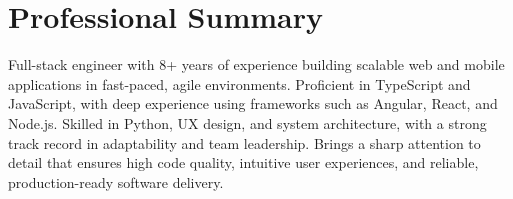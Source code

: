 \section{Professional Summary}
\noindent \normalsize Full-stack engineer with 8+ years of experience building scalable web and mobile applications in fast-paced, agile environments. Proficient in TypeScript and JavaScript, with deep experience using frameworks such as Angular, React, and Node.js. Skilled in Python, UX design, and system architecture, with a strong track record in adaptability and team leadership. Brings a sharp attention to detail that ensures high code quality, intuitive user experiences, and reliable, production-ready software delivery.
\nopagebreak[4]